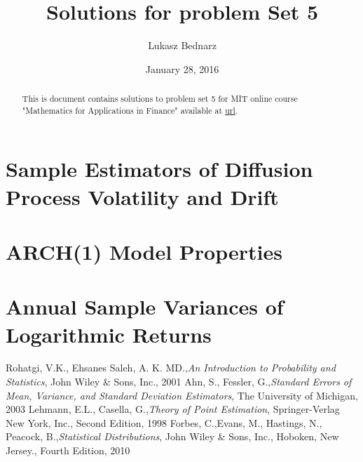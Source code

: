 \documentclass{amsart}
\begin{document}
\def\mathbi#1{\textbf{\em #1}}

\title[Short Title (for the running head)]{Solutions for problem Set 5}
\author{Lukasz Bednarz}
\date{January 28, 2016}
\begin{abstract}
This is document contains solutions to problem set 5 for MIT online course "Mathematics for Applications in Finance" available at 
\href{http://ocw.mit.edu/courses/mathematics/18-s096-topics-in-mathematics-with-applications-in-finance-fall-2013/index.htm}{url}.

\end{abstract}
\maketitle

\section{Sample Estimators of Diffusion Process Volatility and Drift}



\section{}




\section{ARCH(1) Model Properties}


\section{Annual Sample Variances of Logarithmic Returns}



\begin{thebibliography}{9}
 Rohatgi, V.K., Ehsanes Saleh, A. K. MD.,\textit{An Introduction to 
Probability and Statistics}, John Wiley \& Sons, Inc., 2001
 Ahn, S., Fessler, G.,\textit{Standard Errors of Mean, Variance, and Standard
Deviation Estimators}, The University of Michigan, 2003
 Lehmann, E.L., Casella, G.,\textit{Theory of Point Estimation}, 
Springer-Verlag New York, Inc., Second Edition, 1998
 Forbes, C.,Evans, M., Hastings, N., Peacock, B.,\textit{Statistical Distributions}, 
John Wiley \& Sons, Inc., Hoboken, New Jersey., Fourth Edition, 2010
\end{thebibliography}

\begin{appendix}




\end{appendix}
\end{document}
